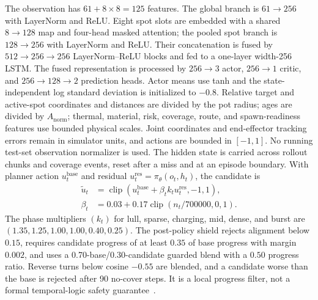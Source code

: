\documentclass[conference]{IEEEtran}
\begin{document}
The observation has $61+8\times8=125$ features. The global branch is
$61\rightarrow256$ with LayerNorm and ReLU. Eight spot slots are embedded
with a shared $8\rightarrow128$ map and four-head masked attention; the pooled
spot branch is $128\rightarrow256$ with LayerNorm and ReLU. Their concatenation
is fused by $512\rightarrow256\rightarrow256$ LayerNorm--ReLU blocks and fed
to a one-layer width-256 LSTM. The fused representation
is processed by $256\rightarrow3$ actor, $256\rightarrow1$ critic, and
$256\rightarrow128\rightarrow2$ prediction heads. Actor means use tanh and
the state-independent log standard deviation is initialized to $-0.8$.
Relative target and active-spot coordinates and distances are divided by the
pot radius; ages are divided by $A_{\mathrm{norm}}$; thermal, material, risk,
coverage, route, and spawn-readiness features use bounded physical scales.
Joint coordinates and end-effector tracking errors remain in simulator units,
and actions are bounded in $[-1,1]$. No running test-set observation
normalizer is used. The hidden state is carried across rollout chunks and
coverage events, reset after a miss and at an episode boundary.
With planner action $u_t^{\mathrm{base}}$ and residual
$u_t^{\mathrm{res}}=\pi_\theta(o_t,h_t)$, the candidate is
\begin{align}
\tilde u_t &= \operatorname{clip}(u_t^{\mathrm{base}}+
\beta_t k_tu_t^{\mathrm{res}},-1,1),\nonumber\\
\beta_t &= 0.03+0.17\operatorname{clip}(n_t/700000,0,1).
\end{align}
The phase multipliers $(k_t)$ for lull, sparse, charging, mid, dense, and
burst are $(1.35,1.25,1.00,1.00,0.40,0.25)$. The post-policy shield rejects
alignment below $0.15$, requires candidate progress of at least $0.35$ of
base progress with margin $0.002$, and uses a 0.70-base/0.30-candidate
guarded blend with a $0.50$ progress ratio. Reverse turns below cosine
$-0.55$ are blended, and a candidate worse than the base is rejected after
90 no-cover steps. It is a local progress filter, not a formal temporal-logic
safety guarantee~\cite{alshiekh2018shielding}.
\end{document}
